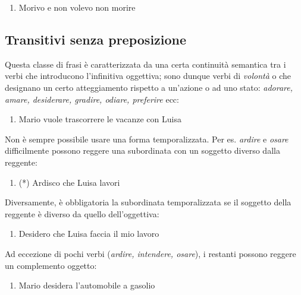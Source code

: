 \documentclass[
  a4paper,
  twoside,
  11pt,
  chapterprefix=false,
  bibliography=totocnumbered,
  listof=flat]{scrbook}
\providecommand{\tightlist}{%
  \setlength{\itemsep}{0pt}\setlength{\parskip}{0pt}}
\begin{document}
\begin{enumerate}
\def\labelenumi{(\arabic{enumi})}
\setcounter{enumi}{52}
\tightlist
\item
  Morivo e non volevo non morire \citep[\emph{Stalinista},][]{giudici2014}
\end{enumerate}

\hypertarget{transitivi-senza-preposizione}{%
\subsection{Transitivi senza preposizione}\label{transitivi-senza-preposizione}}

Questa classe di frasi è caratterizzata da una certa continuità semantica tra i verbi che introducono l'infinitiva oggettiva; sono dunque verbi di \emph{volontà} o che designano un certo atteggiamento rispetto a un'azione o ad uno stato: \emph{adorare, amare, desiderare, gradire, odiare, preferire} ecc:

\begin{enumerate}
\def\labelenumi{(\arabic{enumi})}
\setcounter{enumi}{53}
\tightlist
\item
  Mario vuole trascorrere le vacanze con Luisa
\end{enumerate}

Non è sempre possibile usare una forma temporalizzata. Per es. \emph{ardire} e \emph{osare} difficilmente possono reggere una subordinata con un soggetto diverso dalla reggente:

\begin{enumerate}
\def\labelenumi{(\arabic{enumi})}
\setcounter{enumi}{54}
\tightlist
\item
  (*) Ardisco che Luisa lavori
\end{enumerate}

Diversamente, è obbligatoria la subordinata temporalizzata se il soggetto della reggente è diverso da quello dell'oggettiva:

\begin{enumerate}
\def\labelenumi{(\arabic{enumi})}
\setcounter{enumi}{55}
\tightlist
\item
  Desidero che Luisa faccia il mio lavoro
\end{enumerate}

Ad eccezione di pochi verbi (\emph{ardire, intendere, osare}), i restanti possono reggere un complemento oggetto:

\begin{enumerate}
\def\labelenumi{(\arabic{enumi})}
\setcounter{enumi}{56}
\tightlist
\item
  Mario desidera l'automobile a gasolio
\end{enumerate}
\end{document}
